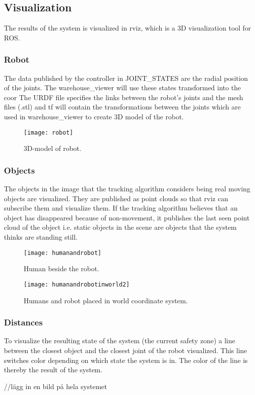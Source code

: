 \subsection{Visualization}

The results of the system is visualized in rviz, which is a 3D visualization tool for ROS. 

\subsubsection{Robot}
The data published by the controller in JOINT\_STATES are the radial position of the joints. The warehouse\_viewer will use these states transformed into the coor The URDF file specifies the links between the robot’s joints and the mesh files (.stl) and tf will contain the transformations between the joints which are used in warehouse\_viewer to create 3D model of the robot. 

\begin{figure}[H]
\begin{center}
\texttt{[image: robot]}
\caption{3D-model of robot.}
\label{tracking}
\end{center}
\end{figure}

\subsubsection{Objects}
The objects in the image that the tracking algorithm considers being real moving objects are visualized. They are published as point clouds so that rviz can subscribe them and visualize them. If the tracking algorithm believes that an object has disappeared because of non-movement, it publishes the last seen point cloud of the object i.e. static objects in the scene are objects that the system thinks are standing still. 

\begin{figure}[H]
\begin{center}
\texttt{[image: humanandrobot]}
\caption{Human beside the robot.}
\label{tracking}
\end{center}
\end{figure}

\begin{figure}[H]
\begin{center}
\texttt{[image: humanandrobotinworld2]}
\caption{Humans and robot placed in world coordinate system.}
\label{tracking}
\end{center}
\end{figure}  

\subsubsection{Distances}
To visualize the resulting state of the system (the current safety zone) a line between the closest object and the closest joint of the robot visualized. This line switches color depending on which state the system is in. The color of the line is thereby the result of the system. 

//lägg in en bild på hela systemet

